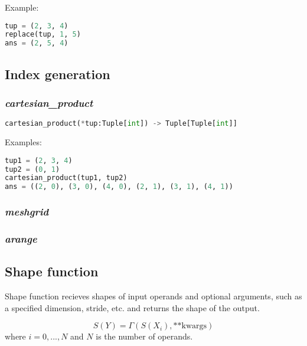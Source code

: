 Example:
\begin{lstlisting}[language=Python]
tup = (2, 3, 4)
replace(tup, 1, 5)
ans = (2, 5, 4)
\end{lstlisting}

\subsection{Index generation}

\subsubsection{\textbf{\textit{cartesian\_product}}}

\begin{lstlisting}[language=Python]
cartesian_product(*tup:Tuple[int]) -> Tuple[Tuple[int]]
\end{lstlisting}

Examples:
\begin{lstlisting}[language=Python]
tup1 = (2, 3, 4)
tup2 = (0, 1)
cartesian_product(tup1, tup2)
ans = ((2, 0), (3, 0), (4, 0), (2, 1), (3, 1), (4, 1))
\end{lstlisting}

\subsubsection{\textbf{\textit{meshgrid}}}

\subsubsection{\textbf{\textit{arange}}}


\subsection{Shape function}

Shape function recieves shapes of input operands and optional arguments, such as a specified dimension, stride, etc. and returns the shape of the output.

$$S(Y) = \Gamma(S(X_i), \text{**kwargs})$$ where $i = 0,...,N$ and $N$ is the number of operands.

